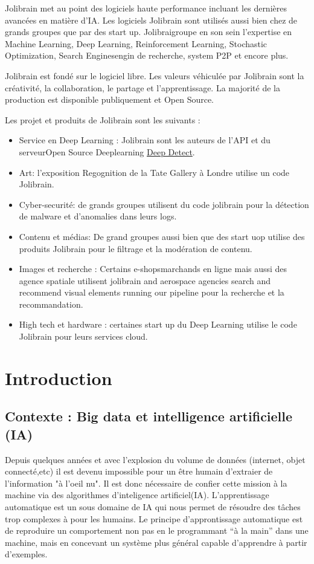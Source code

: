\documentclass[a4paper,12pt]{article}
\begin{document}
Jolibrain met au point des logiciels haute performance incluant les dernières avancées en matière d'IA. Les logiciels Jolibrain sont utilisés aussi bien chez de grands groupes que par des start up. Jolibraigroupe en son sein l'expertise en  Machine Learning, Deep Learning, Reinforcement Learning, Stochastic Optimization, Search Enginesengin de recherche, system P2P et encore plus.

Jolibrain est fondé sur le logiciel libre. Les valeurs véhiculée par Jolibrain sont la créativité, la collaboration, le  partage et l'apprentissage. La majorité de la production est disponible publiquement et Open Source.

Les projet et produits de Jolibrain sont les suivants :
\begin{itemize}
\item   Service en Deep Learning :
  Jolibrain sont les auteurs de l'API  et du serveurOpen Source Deeplearning \href{https://github.com/beniz/deepdetect}{Deep Detect}.
\item Art: l'exposition Regognition de la Tate Gallery à Londre utilise un code Jolibrain.
\item
Cyber-securité: de grands groupes utilisent du code jolibrain pour la détection de malware et d'anomalies dans leurs logs.
\item
Contenu et médias: De grand groupes aussi bien que des start uop utilise des produits Jolibrain pour le filtrage et la modération de contenu.
\item
Images et recherche : Certains e-shopsmarchands en ligne mais aussi des agence spatiale utilisent jolibrain and aerospace agencies search and recommend visual elements running our pipeline pour la recherche et la recommandation.
\item
High tech et hardware : certaines start up du Deep Learning utilise le code Jolibrain pour leurs services cloud.
\end{itemize}

\newpage
\section{Introduction}
\subsection{Contexte : Big data et intelligence artificielle (IA)}
Depuis quelques années  et avec l'explosion du volume de données (internet, objet connecté,etc) il est devenu impossible pour un être humain d'extraier de l'information "à l'oeil nu".  
Il est donc nécessaire de confier cette mission à la machine via des algorithmes d'inteligence artificiel(IA).
L'apprentissage automatique est un sous domaine de IA qui nous permet de résoudre des tâches trop complexes à pour les humains.\newline    
Le principe d'approntissage automatique est de reproduire un comportement non pas en le programmant “à la main” dans une machine, mais en concevant un système plus général capable d’apprendre à partir d’exemples.
\end{document}
